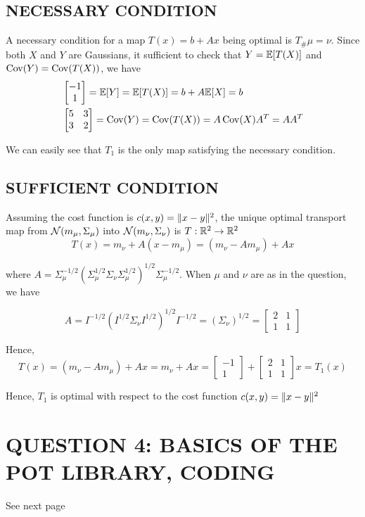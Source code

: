 \subsection{NECESSARY CONDITION}

A necessary condition for a map $T(x) = b + Ax$ being optimal is $T_\# \mu = \nu$. Since both $X$ and $Y$ are Gaussians, it sufficient to check that $Y = \mathbb{E}[T(X)]$ and $\operatorname{Cov}(Y) = \operatorname{Cov}(T(X))$, we have 
\begin{align*}
	&\begin{bmatrix}
		-1 \\
		1
	\end{bmatrix} = \mathbb{E}[Y] = \mathbb{E}[T(X)] = b + A \mathbb{E}[X] = b \\
	&\begin{bmatrix}
		5 & 3 \\
		3 & 2
	\end{bmatrix} = \operatorname{Cov}(Y) = \operatorname{Cov}(T(X)) = A \operatorname{Cov}(X) A^T = AA^T
\end{align*}

We can easily see that $T_1$ is the only map satisfying the necessary condition.

\subsection{SUFFICIENT CONDITION}

Assuming the cost function is $c(x, y) = \lVert x - y\rVert^2$, the unique optimal transport map from $\mathcal{N}(m_\mu, \Sigma_\mu)$ into $\mathcal{N}(m_\nu, \Sigma_\nu)$ is $T: \mathbb{R}^2 \to \mathbb{R}^2$
$$
	T(x) = m_\nu + A(x - m_\mu) = (m_\nu - A m_\mu) + Ax
$$

where $A = \Sigma_\mu^{-1/2}(\Sigma_\mu^{1/2} \Sigma_\nu \Sigma_\mu^{1/2})^{1/2} \Sigma_\mu^{-1/2}$. When $\mu$ and $\nu$ are as in the question, we have

$$
	A = I^{-1/2}(I^{1/2} \Sigma_\nu I^{1/2})^{1/2} I^{-1/2} = (\Sigma_\nu)^{1/2} = \begin{bmatrix}
		2 & 1 \\
		1 & 1
	\end{bmatrix}
$$

Hence,
$$
	T(x) = (m_\nu - A m_\mu) + Ax = m_\nu + A x = \begin{bmatrix}
		-1 \\
		1
	\end{bmatrix} + \begin{bmatrix}
	2 & 1 \\
	1 & 1
	\end{bmatrix} x = T_1(x)
$$

Hence, $T_1$ is optimal with respect to the cost function $c(x, y) = \lVert x - y\rVert^2$




\section{QUESTION 4: BASICS OF THE POT LIBRARY, CODING}

See next page


